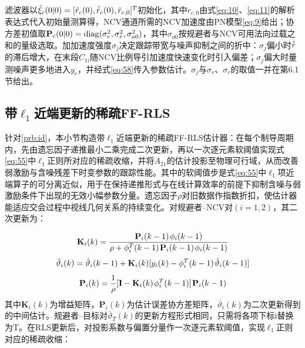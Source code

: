 滤波器以${\hat \xi _c}(0|0) = {[\tilde{r}_{c}(0),\tilde{\dot{r}}_{c}(0),{{\ddot r}_{c,0}}]^T}$初始化，其中${\ddot r_{c,0}}$由式\eqref{eq:10}、\eqref{eq:11}的解析表达式代入初始量测算得，NCV通道所需的NCV加速度由PN模型\eqref{eq:9}给出；协方差初值取${{\mathbf{P}}_c}(0|0) = \operatorname{diag}(\sigma _r^2,\sigma _{\dot r}^2,\sigma _{a0}^2)$，其中${\sigma _{a0}}$按规避者与NCV可用法向过载之和的量级选取。加加速度强度${\sigma _j}$决定跟踪带宽与噪声抑制之间的折中：${\sigma _j}$偏小时$\hat{\ddot{r}}$的滞后增大，在末段${C_{1i}}$随NCV比例导引加速度快速变化时引入偏差；${\sigma _j}$偏大时量测噪声更多地进入${y_c}$，并经式\eqref{eq:58}传入参数估计。${\sigma _j}$与${\sigma _r}$、${\sigma _{\dot r}}$的取值一并在第6.1节给出。

\subsection{带${\ell _1}$近端更新的稀疏FF-RLS}
针对\cref{prb:id}，本小节构造带${\ell _1}$近端更新的稀疏FF-RLS估计器：在每个制导周期内，先由遗忘因子递推最小二乘完成二次更新\cite{ljung1999,johnstone1982}，再以一次逐元素软阈值实现式\eqref{eq:55}中${\ell _1}$正则所对应的稀疏收缩，并将${A_{21}}$的估计投影至物理可行域，从而改善弱激励与含噪残差下时变参数的跟踪性能。其中的软阈值步是式\eqref{eq:55}中${\ell _1}$项近端算子的可分离近似，用于在保持递推形式与在线计算效率的前提下抑制含噪与弱激励条件下出现的无效小幅参数分量。遗忘因子$\rho$对旧数据作指数折扣，使估计器能适应交会过程中视线几何关系的持续变化。对规避者–NCV对$(i = 1,2)$，其二次更新为：

\begin{equation}
\label{eq:57}
{{\mathbf{K}}_i}(k) = \frac{{{{\mathbf{P}}_i}(k - 1){\kern 1pt} {\phi _i}(k - 1)}}{{\rho  + \phi _i^T(k - 1){\kern 1pt} {{\mathbf{P}}_i}(k - 1){\kern 1pt} {\phi _i}(k - 1)}}
\end{equation}
\begin{equation}
\label{eq:58}
\bar{\vartheta}_{i}(k) = \hat{\vartheta}_{i}(k - 1) + {{\mathbf{K}}_i}(k)[{y_i}(k) - \phi _i^T(k - 1){\kern 1pt} \hat{\vartheta}_{i}(k - 1)]
\end{equation}
\begin{equation}
\label{eq:59}
{{\mathbf{P}}_i}(k) = \frac{1}{\rho }[{\mathbf{I}} - {{\mathbf{K}}_i}(k){\kern 1pt} \phi _i^T(k - 1)]{\kern 1pt} {{\mathbf{P}}_i}(k - 1)
\end{equation}
其中${{\mathbf{K}}_i}(k)$为增益矩阵，${{\mathbf{P}}_i}(k)$为估计误差协方差矩阵，$\bar{\vartheta}_{i}(k)$为二次更新得到的中间估计。规避者–目标对$\bar{\vartheta}_{T}(k)$的更新方程形式相同，只需将各项下标i替换为T。在RLS更新后，对投影系数与偏置分量作一次逐元素软阈值，实现${\ell _1}$正则对应的稀疏收缩：

